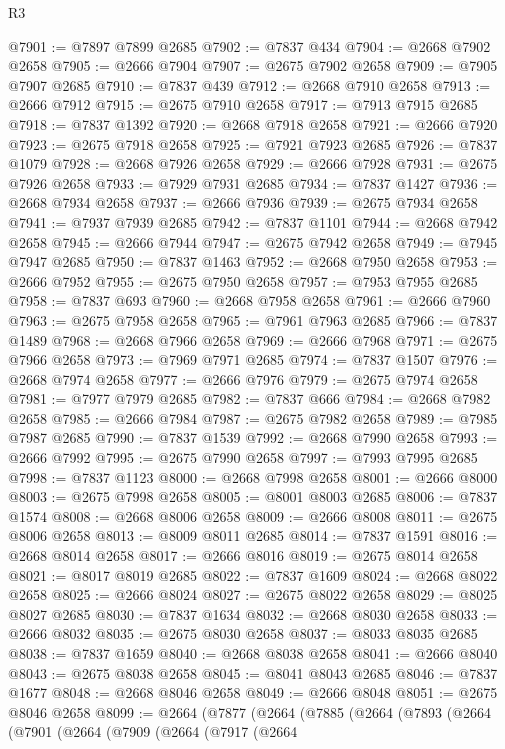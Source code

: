 \begin{lexlean}{R3}
\begin{coremodule}
@7901 := @7897 @7899 @2685
@7902 := @7837 @434
@7904 := @2668 @7902 @2658
@7905 := @2666 @7904
@7907 := @2675 @7902 @2658
@7909 := @7905 @7907 @2685
@7910 := @7837 @439
@7912 := @2668 @7910 @2658
@7913 := @2666 @7912
@7915 := @2675 @7910 @2658
@7917 := @7913 @7915 @2685
@7918 := @7837 @1392
@7920 := @2668 @7918 @2658
@7921 := @2666 @7920
@7923 := @2675 @7918 @2658
@7925 := @7921 @7923 @2685
@7926 := @7837 @1079
@7928 := @2668 @7926 @2658
@7929 := @2666 @7928
@7931 := @2675 @7926 @2658
@7933 := @7929 @7931 @2685
@7934 := @7837 @1427
@7936 := @2668 @7934 @2658
@7937 := @2666 @7936
@7939 := @2675 @7934 @2658
@7941 := @7937 @7939 @2685
@7942 := @7837 @1101
@7944 := @2668 @7942 @2658
@7945 := @2666 @7944
@7947 := @2675 @7942 @2658
@7949 := @7945 @7947 @2685
@7950 := @7837 @1463
@7952 := @2668 @7950 @2658
@7953 := @2666 @7952
@7955 := @2675 @7950 @2658
@7957 := @7953 @7955 @2685
@7958 := @7837 @693
@7960 := @2668 @7958 @2658
@7961 := @2666 @7960
@7963 := @2675 @7958 @2658
@7965 := @7961 @7963 @2685
@7966 := @7837 @1489
@7968 := @2668 @7966 @2658
@7969 := @2666 @7968
@7971 := @2675 @7966 @2658
@7973 := @7969 @7971 @2685
@7974 := @7837 @1507
@7976 := @2668 @7974 @2658
@7977 := @2666 @7976
@7979 := @2675 @7974 @2658
@7981 := @7977 @7979 @2685
@7982 := @7837 @666
@7984 := @2668 @7982 @2658
@7985 := @2666 @7984
@7987 := @2675 @7982 @2658
@7989 := @7985 @7987 @2685
@7990 := @7837 @1539
@7992 := @2668 @7990 @2658
@7993 := @2666 @7992
@7995 := @2675 @7990 @2658
@7997 := @7993 @7995 @2685
@7998 := @7837 @1123
@8000 := @2668 @7998 @2658
@8001 := @2666 @8000
@8003 := @2675 @7998 @2658
@8005 := @8001 @8003 @2685
@8006 := @7837 @1574
@8008 := @2668 @8006 @2658
@8009 := @2666 @8008
@8011 := @2675 @8006 @2658
@8013 := @8009 @8011 @2685
@8014 := @7837 @1591
@8016 := @2668 @8014 @2658
@8017 := @2666 @8016
@8019 := @2675 @8014 @2658
@8021 := @8017 @8019 @2685
@8022 := @7837 @1609
@8024 := @2668 @8022 @2658
@8025 := @2666 @8024
@8027 := @2675 @8022 @2658
@8029 := @8025 @8027 @2685
@8030 := @7837 @1634
@8032 := @2668 @8030 @2658
@8033 := @2666 @8032
@8035 := @2675 @8030 @2658
@8037 := @8033 @8035 @2685
@8038 := @7837 @1659
@8040 := @2668 @8038 @2658
@8041 := @2666 @8040
@8043 := @2675 @8038 @2658
@8045 := @8041 @8043 @2685
@8046 := @7837 @1677
@8048 := @2668 @8046 @2658
@8049 := @2666 @8048
@8051 := @2675 @8046 @2658
@8099 := @2664
    (@7877
      (@2664
        (@7885
          (@2664
            (@7893
              (@2664
                (@7901
                  (@2664
                    (@7909
                      (@2664
                        (@7917
                          (@2664

\end{coremodule}
\end{lexlean}
